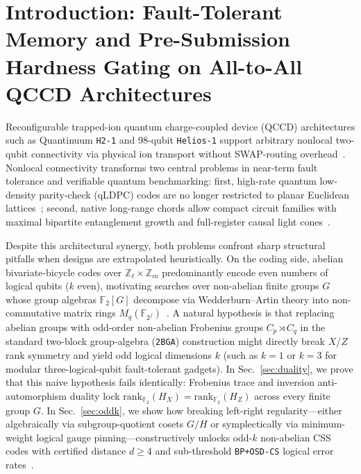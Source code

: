 \documentclass[aps,prapplied,reprint,longbibliography]{revtex4-2}
\begin{document}
\maketitle

\section{Introduction: Fault-Tolerant Memory and Pre-Submission Hardness Gating on All-to-All QCCD Architectures}
\label{sec:intro}

Reconfigurable trapped-ion quantum charge-coupled device (QCCD) architectures such as Quantinuum \texttt{H2-1} and 98-qubit \texttt{Helios-1} support arbitrary nonlocal two-qubit connectivity via physical ion transport without SWAP-routing overhead~\cite{moses2023race}. Nonlocal connectivity transforms two central problems in near-term fault tolerance and verifiable quantum benchmarking: first, high-rate quantum low-density parity-check (qLDPC) codes are no longer restricted to planar Euclidean lattices~\cite{breuckmann2021quantum,panteleev2022asymptotically,bravyi2024high}; second, native long-range chords allow compact circuit families with maximal bipartite entanglement growth and full-register causal light cones~\cite{aaronson2025verifiable,gharibian2025peaked}.

Despite this architectural synergy, both problems confront sharp structural pitfalls when designs are extrapolated heuristically. On the coding side, abelian bivariate-bicycle codes over $\mathbb{Z}_\ell \times \mathbb{Z}_m$ predominantly encode even numbers of logical qubits ($k$ even), motivating searches over non-abelian finite groups $G$ whose group algebras $\mathbb{F}_2[G]$ decompose via Wedderburn--Artin theory into non-commutative matrix rings $M_q(\mathbb{F}_{2^f})$~\cite{lin2024quantum,kovalev2013quantum}. A natural hypothesis is that replacing abelian groups with odd-order non-abelian Frobenius groups $C_p \rtimes C_q$ in the standard two-block group-algebra (\texttt{2BGA}) construction might directly break $X$/$Z$ rank symmetry and yield odd logical dimensions $k$ (such as $k=1$ or $k=3$ for modular three-logical-qubit fault-tolerant gadgets). In Sec.~\ref{sec:duality}, we prove that this naive hypothesis fails identically: Frobenius trace and inversion anti-automorphism duality lock $\mathrm{rank}_{\mathbb{F}_2}(H_X) = \mathrm{rank}_{\mathbb{F}_2}(H_Z)$ across every finite group $G$. In Sec.~\ref{sec:oddk}, we show how breaking left-right regularity---either algebraically via subgroup-quotient cosets $G/H$ or symplectically via minimum-weight logical gauge pinning---constructively unlocks \TwoBgaOddKCount{} odd-$k$ non-abelian CSS codes with certified distance $d \ge 4$ and sub-threshold \texttt{BP+OSD-CS} logical error rates~\cite{panteleev2021degenerate,roffe2020decoding}.
\end{document}
